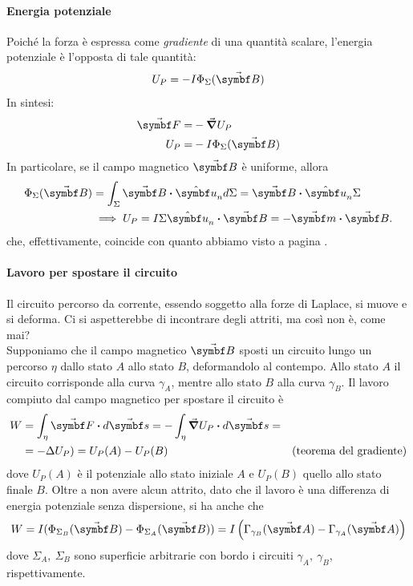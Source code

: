 \paragraph{Energia potenziale}
Poiché la forza è espressa come \textit{gradiente} di una quantità scalare, l'energia potenziale è l'opposta di tale quantità:
\begin{equation}
	U_P=-I\Phi_{\Sigma}(\vba{B})
\end{equation}
In sintesi:
\begin{align}
	\vba{F}=&-\grad{U_P}\\
	U_P=&-I\Phi_{\Sigma}(\vba{B})
\end{align}
In particolare, se il campo magnetico $\vba{B}$ è uniforme, allora
\begin{align*}
	\Phi_{\Sigma}(\vba{B})&=\int_{\Sigma}\vba{B}\vdot\vbh{u}_nd\Sigma=\vba{B}\vdot\vbh{u}_n \Sigma\\
	&\implies U_P=I\Sigma \vbh{u}_n \vdot \vba{B}=-\vba{m}\vdot\vba{B}. 
\end{align*}
che, effettivamente, coincide con quanto abbiamo visto a pagina \pageref{EnergiaPotenzialeCasoGeneralemanontroppo}.
\paragraph{Lavoro per spostare il circuito}
Il circuito percorso da corrente, essendo soggetto alla forze di Laplace, si muove e si deforma. Ci si aspetterebbe di incontrare degli attriti, ma così non è, come mai?\\
Supponiamo che il campo magnetico $\vba{B}$ sposti un circuito lungo un percorso $\eta$ dallo stato $A$ allo stato $B$, deformandolo al contempo. Allo stato $A$ il circuito corrisponde alla curva $\gamma_A$, mentre allo stato $B$ alla curva $\gamma_B$. Il lavoro compiuto dal campo magnetico per spostare il circuito è
\begin{align*}
	W&=\int_{\eta}\vba{F}\vdot d\vba{s}=-\int_{\eta}\grad{U_P}\vdot d\vba{s}=&&\\
	&=-\Delta{U_P})=U_P(A)-U_P(B)&&\text{(teorema del gradiente)}
\end{align*}
dove $U_P(A)$ è il potenziale allo stato iniziale $A$ e $U_P(B)$ quello allo stato finale $B$. Oltre a non avere alcun attrito, dato che il lavoro è una differenza di energia potenziale senza dispersione, si ha anche che
\begin{equation}
	W=I(\Phi_{\Sigma_B}(\vba{B})-\Phi_{\Sigma_A}(\vba{B}))=I\left(\Gamma_{\gamma_B}(\vba{A})-\Gamma_{\gamma_A}(\vba{A})\right)
\end{equation}
dove $\Sigma_A,\ \Sigma_B$ sono superficie arbitrarie con bordo i circuiti $\gamma_A,\ \gamma_B$, rispettivamente.

